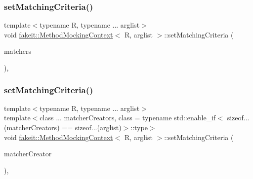\mbox{\label{classfakeit_1_1MethodMockingContext_affc5ac50fc419a5f8b5adff8d5d02941}} 
\subsubsection{\texorpdfstring{setMatchingCriteria()}{setMatchingCriteria()}\hspace{0.1cm}{\footnotesize\ttfamily [23/27]}}
{\footnotesize\ttfamily template$<$typename R, typename ... arglist$>$ \\
void \mbox{\hyperlink{classfakeit_1_1MethodMockingContext}{fakeit\+::\+Method\+Mocking\+Context}}$<$ R, arglist $>$\+::set\+Matching\+Criteria (\begin{DoxyParamCaption}\item[{const std\+::vector$<$ \mbox{\hyperlink{classfakeit_1_1Destructible}{Destructible}} $\ast$ $>$ \&}]{matchers }\end{DoxyParamCaption})\hspace{0.3cm}{\ttfamily [inline]}, {\ttfamily [protected]}}

\mbox{\label{classfakeit_1_1MethodMockingContext_ab6bf85e9f9f5e5eeb2766ec487a42e20}} 
\subsubsection{\texorpdfstring{setMatchingCriteria()}{setMatchingCriteria()}\hspace{0.1cm}{\footnotesize\ttfamily [24/27]}}
{\footnotesize\ttfamily template$<$typename R, typename ... arglist$>$ \\
template$<$class ... matcher\+Creators, class  = typename std\+::enable\+\_\+if$<$                sizeof...(matcher\+Creators) == sizeof...(arglist)$>$\+::type$>$ \\
void \mbox{\hyperlink{classfakeit_1_1MethodMockingContext}{fakeit\+::\+Method\+Mocking\+Context}}$<$ R, arglist $>$\+::set\+Matching\+Criteria (\begin{DoxyParamCaption}\item[{const matcher\+Creators \&...}]{matcher\+Creator }\end{DoxyParamCaption})\hspace{0.3cm}{\ttfamily [inline]}, {\ttfamily [protected]}}

